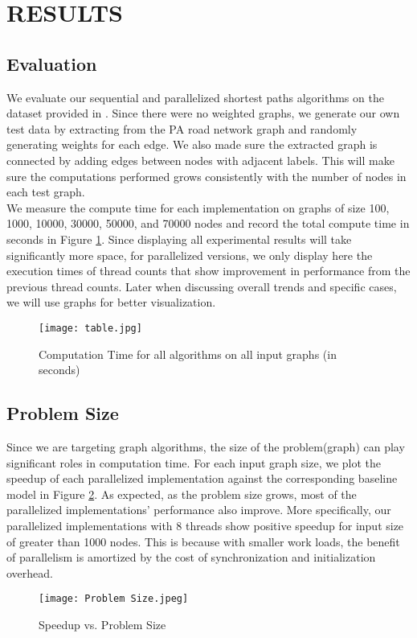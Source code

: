 \documentclass[12pt]{article}
\begin{document}
\newpage
\section{RESULTS}
\subsection{Evaluation}
We evaluate our sequential and parallelized shortest paths algorithms on the dataset provided in \cite{snapnets}. Since there were no weighted graphs, we generate our own test data by extracting from the PA road network graph and randomly generating weights for each edge. We also made sure the extracted graph is connected by adding edges between nodes with adjacent labels. This will make sure the computations performed grows consistently with the number of nodes in each test graph.\\
We measure the compute time for each implementation on graphs of size 100, 1000, 10000, 30000, 50000, and 70000 nodes and record the total compute time in seconds in Figure \ref{fig:all}. Since displaying all experimental results will take significantly more space, for parallelized versions, we only display here the execution times of thread counts that show improvement in performance from the previous thread counts. Later when discussing overall trends and specific cases, we will use graphs for better visualization.
\begin{figure}[hbt!]
\begin{center}
  \texttt{[image: table.jpg]}
  \caption{Computation Time for all algorithms on all input graphs (in seconds)}
  \label{fig:all}
  \end{center}
\end{figure} 

\subsection{Problem Size}
Since we are targeting graph algorithms, the size of the problem(graph) can play significant roles in computation time. For each input graph size, we plot the speedup of each parallelized implementation against the corresponding baseline model in Figure \ref{fig:size}. As expected, as the problem size grows, most of the parallelized implementations' performance also improve. More specifically, our parallelized implementations with 8 threads show positive speedup for input size of greater than 1000 nodes. This is because with smaller work loads, the benefit of parallelism is amortized by the cost of synchronization and initialization overhead.
\begin{figure}[h!]
\begin{center}
  \texttt{[image: Problem Size.jpeg]}
  \caption{Speedup vs. Problem Size}
  \label{fig:size}
  \end{center}
\end{figure}
\end{document}
